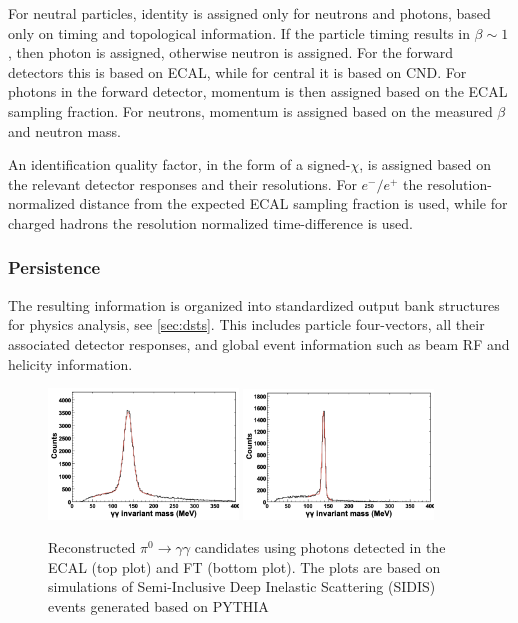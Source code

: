 For neutral particles, identity is assigned only for neutrons and photons, based only on timing and topological information.  If the particle timing results in $\beta\sim1$, then photon is assigned, otherwise neutron is assigned.  For the forward detectors this is based on ECAL, while for central it is based on CND.  For photons in the forward detector, momentum is then assigned based on the ECAL sampling fraction.  For neutrons, momentum is assigned based on the measured $\beta$ and neutron mass.

An identification quality factor, in the form of a signed-$\chi$, is assigned based on the relevant detector responses and their resolutions.  For $e^-/e^+$ the resolution-normalized distance from the expected ECAL sampling fraction is used, while for charged hadrons the resolution normalized time-difference is used.

\subsubsection{Persistence}
The resulting information is organized into standardized output bank structures for physics analysis, see \ref{sec:dsts}.  This includes particle four-vectors, all their associated detector responses, and global event information such as beam RF and helicity information.


\begin{figure}
\centering
\includegraphics[width=0.45\textwidth]{pics/ecal_pi0.png}
\includegraphics[width=0.45\textwidth]{pics/ft_pi0.png}
\caption{Reconstructed $\pi^{0}\rightarrow \gamma \gamma$ candidates using photons detected in the ECAL (top plot) and FT (bottom plot). The plots are based on simulations of Semi-Inclusive Deep Inelastic Scattering (SIDIS) events generated based on PYTHIA~\cite{clasdis}}
\label{fig:pi0mass}
\end{figure}
